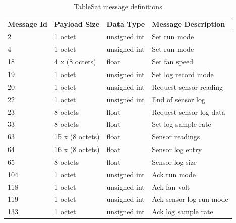 \begin{table}[H]
  \centering
  \begin{tabular}{|l|l|l|l|}
    \hline
    Message Id & Payload Size & Data Type & Message Description \\ \hline
    2 & 1 octet & unsigned int & Set run mode \\ \hline
    4 & 1 octet & unsigned int & Set run mode \\ \hline
    18 & 4 x (8 octets) & float & Set fan speed \\ \hline
    19 & 1 octet & unsigned int & Set log record mode \\ \hline
    20 & 1 octet & unsigned int & Request sensor reading \\ \hline
    22 & 1 octet & unsigned int & End of sensor log \\ \hline
    23 & 8 octets & float & Request sensor log data \\ \hline
    33 & 8 octets & float & Set log sample rate \\ \hline
    63 & 15 x (8 octets) & float & Sensor readings \\ \hline
    64 & 16 x (8 octets) & float & Sensor log entry \\ \hline
    65 & 8 octets & float & Sensor log size \\ \hline
    104 & 1 octet & unsigned int & Ack run mode \\ \hline
    118 & 1 octet & unsigned int & Ack fan volt \\ \hline
    119 & 1 octet & unsigned int & Ack sensor log run mode \\ \hline
    133 & 1 octet & unsigned int & Ack log sample rate \\ \hline
  \end{tabular}
  \caption{TableSat message definitions}
  \label{tbl:UDPMessageDefinitions}
\end{table}
